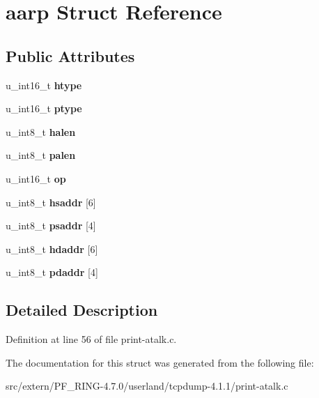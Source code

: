 \hypertarget{structaarp}{
\section{aarp Struct Reference}
\label{structaarp}
}
\subsection*{Public Attributes}
\begin{DoxyCompactItemize}
\item 
\hypertarget{structaarp_a38f7b1c70b9100fb85046a0492123673}{
u\_\-int16\_\-t {\bfseries htype}}
\label{structaarp_a38f7b1c70b9100fb85046a0492123673}

\item 
\hypertarget{structaarp_a73cd9289e6882f66b94685f1b5aac782}{
u\_\-int16\_\-t {\bfseries ptype}}
\label{structaarp_a73cd9289e6882f66b94685f1b5aac782}

\item 
\hypertarget{structaarp_a4a4ef49bf1ef13d1f3bee6b380155009}{
u\_\-int8\_\-t {\bfseries halen}}
\label{structaarp_a4a4ef49bf1ef13d1f3bee6b380155009}

\item 
\hypertarget{structaarp_a42fa588760a4097b45d03851968a9dbb}{
u\_\-int8\_\-t {\bfseries palen}}
\label{structaarp_a42fa588760a4097b45d03851968a9dbb}

\item 
\hypertarget{structaarp_aec62cd24cca1c2971f54ecff4552139b}{
u\_\-int16\_\-t {\bfseries op}}
\label{structaarp_aec62cd24cca1c2971f54ecff4552139b}

\item 
\hypertarget{structaarp_aa5aca57efe7a46d7c190e68b82b19702}{
u\_\-int8\_\-t {\bfseries hsaddr} \mbox{[}6\mbox{]}}
\label{structaarp_aa5aca57efe7a46d7c190e68b82b19702}

\item 
\hypertarget{structaarp_ade7140de797a90cbba1c92affe617889}{
u\_\-int8\_\-t {\bfseries psaddr} \mbox{[}4\mbox{]}}
\label{structaarp_ade7140de797a90cbba1c92affe617889}

\item 
\hypertarget{structaarp_aaa4b71ae00e7a0b734196285e954d684}{
u\_\-int8\_\-t {\bfseries hdaddr} \mbox{[}6\mbox{]}}
\label{structaarp_aaa4b71ae00e7a0b734196285e954d684}

\item 
\hypertarget{structaarp_a3716432c6a11956861dc93e7cc69f914}{
u\_\-int8\_\-t {\bfseries pdaddr} \mbox{[}4\mbox{]}}
\label{structaarp_a3716432c6a11956861dc93e7cc69f914}

\end{DoxyCompactItemize}


\subsection{Detailed Description}


Definition at line 56 of file print-\/atalk.c.



The documentation for this struct was generated from the following file:\begin{DoxyCompactItemize}
\item 
src/extern/PF\_\-RING-\/4.7.0/userland/tcpdump-\/4.1.1/print-\/atalk.c\end{DoxyCompactItemize}
